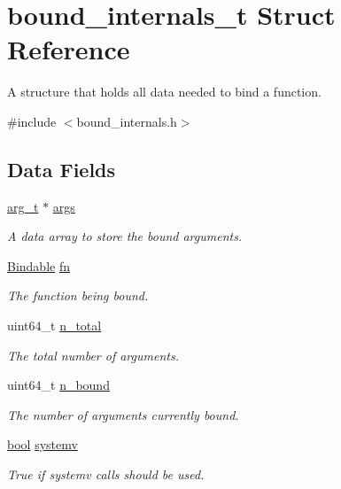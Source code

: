 \hypertarget{structbound__internals__t}{}\section{bound\+\_\+internals\+\_\+t Struct Reference}
\label{structbound__internals__t}


A structure that holds all data needed to bind a function.  




{\ttfamily \#include $<$bound\+\_\+internals.\+h$>$}

\subsection*{Data Fields}
\begin{DoxyCompactItemize}
\item 
\hyperlink{bind__defs_8h_aa409ee08129c587e002cf2062a09a744}{arg\+\_\+t} $\ast$ \hyperlink{structbound__internals__t_a84757175e6e08d7364e8aad728e49985}{args}
\begin{DoxyCompactList}\small\item\em A data array to store the bound arguments. \end{DoxyCompactList}\item 
\hyperlink{bind__defs_8h_a8fdbf6bcbe597219692d8bd8952b9839}{Bindable} \hyperlink{structbound__internals__t_ac9b29b4f9b69674cef9fb3d083b92521}{fn}
\begin{DoxyCompactList}\small\item\em The function being bound. \end{DoxyCompactList}\item 
uint64\+\_\+t \hyperlink{structbound__internals__t_a804e2e3c6b4c0ca1814c6884ed0bd161}{n\+\_\+total}
\begin{DoxyCompactList}\small\item\em The total number of arguments. \end{DoxyCompactList}\item 
uint64\+\_\+t \hyperlink{structbound__internals__t_aa959691320a507b149ff25164740a323}{n\+\_\+bound}
\begin{DoxyCompactList}\small\item\em The number of arguments currently bound. \end{DoxyCompactList}\item 
\hyperlink{bound__internals_8h_af6a258d8f3ee5206d682d799316314b1}{bool} \hyperlink{structbound__internals__t_af4af2491e60d6cda5a3bde0091d8b5c0}{systemv}
\begin{DoxyCompactList}\small\item\em True if systemv calls should be used. \end{DoxyCompactList}\end{DoxyCompactItemize}


